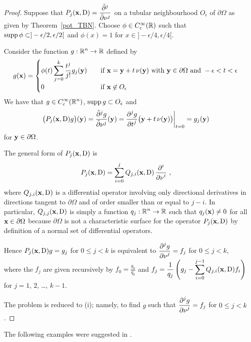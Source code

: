 \begin{proof}
 Suppose that
$\displaystyle P_j(\mathbf{x},\operatorname{D}) = \frac{\tilde{\partial}^{j}{}}{\tilde{\partial}{\mathbf{\nu}}^{j}}$ on a
tubular neighbourhood $O_\epsilon$ of $\partial \Omega$ as given
by Theorem~\ref{pot_TBN}.  Choose $\phi\in C^\infty_c(\mathbb{R})$ such that
$\displaystyle \operatorname{supp} \phi \subset ]-\epsilon/2, \epsilon/2[$ and
$\phi(x) = 1$ for $x\in]-\epsilon/4, \epsilon/4[$.

Consider the function $\displaystyle g:\mathbb{R}^n \rightarrow \mathbb{R}$ defined by
\[
g(\mathbf{x}) =
\begin{cases}
\displaystyle \phi(t) \sum_{j=0}^k \frac{t^j}{j!} g_j(\mathbf{y}) &\quad
\text{if} \ \mathbf{x} = \mathbf{y} + t\, \mathbf{\nu}(\mathbf{y}) \
\text{with} \ \mathbf{y} \in \partial \Omega \ \text{and} \
-\epsilon < t < \epsilon \\[0.7em]
0 & \quad \text{if} \ \mathbf{x} \not\in O_\epsilon
\end{cases}
\]
We have that $\displaystyle g\in C^\infty_c(\mathbb{R}^n)$,
$\displaystyle \operatorname{supp} g \subset O_\epsilon$ and
\[
\big( P_j(\mathbf{x},\operatorname{D})g\big)(\mathbf{y}) = \frac{\tilde{\partial}^{j}{g}}{\tilde{\partial}{\mathbf{\nu}}^{j}}(\mathbf{y})
= \frac{\displaystyle \partial^{j}{g}} {\displaystyle \partial t^{j}}\big(\mathbf{y}+t\, \mathbf{\nu}(\mathbf{y})\big)\bigg|_{t=0}
= g_j(\mathbf{y})
\]
for $\mathbf{y} \in \partial \Omega$.

 The general form of $P_j(\mathbf{x},\operatorname{D})$ is
\[
P_j(\mathbf{x},\operatorname{D}) = \sum_{i=0}^j Q_{j,i}(\mathbf{x},\operatorname{D})\,
\frac{\displaystyle \partial^{i}{}} {\displaystyle \partial \mathbf{\nu}^{i}} \  ,
\]
where $Q_{j,i}(\mathbf{x},\operatorname{D})$ is a differential operator involving only
directional derivatives in directions tangent to $\partial \Omega$ and
of order smaller than or equal to $j-i$.  In particular,
$Q_{j,j}(\mathbf{x},\operatorname{D})$ is simply a function
$\displaystyle q_j:\mathbb{R}^n\rightarrow \mathbb{R}$
such that $q_j(\mathbf{x}) \neq 0$ for all $\mathbf{x} \in \partial \Omega$
because $\partial \Omega$ is not a characteristic surface for the
operator $P_j(\mathbf{x},\operatorname{D})$ by definition of a normal set of differential
operators.

Hence $P_j(\mathbf{x},\operatorname{D})g=g_j$ for $0\leq j < k$ is equivalent to
$\displaystyle \frac{\displaystyle \partial^{j}{g}} {\displaystyle \partial \mathbf{\nu}^{j}} = f_j$ for $0\leq j < k$, where
the $f_j$ are given recursively by $\displaystyle f_0 = \frac{g_0}{q_0}$
and
$\displaystyle f_j = \frac{1}{q_j} \left( g_j - \sum_{i=0}^{j-1}
Q_{j,i}(\mathbf{x},\operatorname{D}) f_i \right)$
for $j=1$, $2$, \ldots, $k-1$.

The problem is reduced to (i); namely, to find $g$ such
that $\displaystyle \frac{\displaystyle \partial^{j}{g}} {\displaystyle \partial \mathbf{\nu}^{j}} = f_j$ for $0\leq j < k$.
\end{proof}

The following examples were suggested in \cite{FoPDE}.

